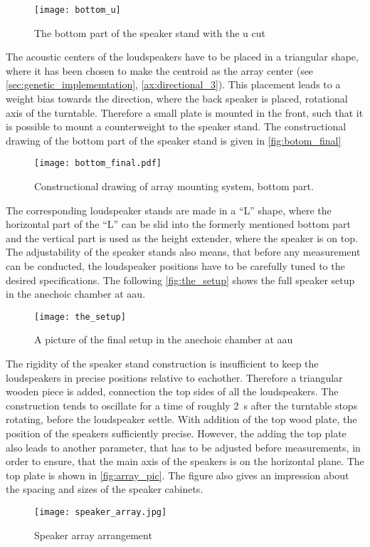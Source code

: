 \begin{figure}[H]
	\centering
	\texttt{[image: bottom\_u]}
	\caption{The bottom part of the speaker stand with the u cut}
		\label{fig:botom_u}
\end{figure}

The acoustic centers of the loudspeakers have to be placed in a triangular shape, where it has been chosen to make the centroid as the array center (see \autoref{sec:genetic_implememtation}, \autoref{ax:directional_3}). This placement leads to a weight bias towards the direction, where the back speaker is placed, rotational axis of the turntable. Therefore a small plate is mounted in the front, such that it is possible to mount a counterweight to the speaker stand. The constructional drawing of the bottom part of the speaker stand is given in \autoref{fig:botom_final}

\begin{figure}[H]
	\centering
	\texttt{[image: bottom\_final.pdf]}
	\caption{Constructional drawing of array mounting system, bottom part.}
		\label{fig:botom_final}
\end{figure}

The corresponding loudspeaker stands are made in a ``L'' shape, where the horizontal part of the ``L'' can be slid into the formerly mentioned bottom part and the vertical part is used as the height extender, where the speaker is on top. The adjustability of the speaker stands also means, that before any measurement can be conducted, the loudspeaker positions have to be carefully tuned to the desired specifications. The following \autoref{fig:the_setup} shows the full speaker setup in the anechoic chamber at \gls{aau}.

  \begin{figure}[H]
	\centering
	\texttt{[image: the\_setup]}
	\caption{A picture of the final setup in the anechoic chamber at \gls{aau}}
		\label{fig:the_setup}
\end{figure}

The rigidity of the speaker stand construction is insufficient to keep the loudspeakers in precise positions relative to eachother. Therefore a triangular wooden piece is added, connection the top sides of all the loudspeakers. The construction tends to oscillate for a time of roughly \SI{2}{\second} after the turntable stops rotating, before the loudspeaker settle. With addition of the top wood plate, the position of the speakers sufficiently precise. However, the adding the top plate also leads to another parameter, that has to be adjusted before measurements, in order to ensure, that the main axis of the speakers is on the horizontal plane. 
The top plate is shown in \autoref{fig:array_pic}. The figure also gives an impression about the spacing and sizes of the speaker cabinets.

\begin{figure}[H]
	\centering
    \texttt{[image: speaker\_array.jpg]}
    \caption{Speaker array arrangement}
    \label{fig:array_pic}
\end{figure}





